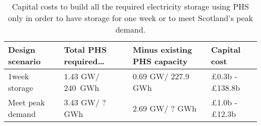 \begin{table}[htbp]
	\caption{Capital costs to build all the required electricity storage using PHS only in order to have storage for one week or to meet Scotland's peak demand.}
	\label{tbl:costs}
	\centering
		\begin{tabular}{@{}llll@{}}
		\toprule
		Design scenario & Total PHS required\ldots & Minus existing PHS capacity & Capital cost \\ \midrule
		1week storage & 1.43 GW/ 240~GWh & 0.69 GW/ 227.9 GWh & £0.3b - £138.8b \\
		Meet peak demand & 3.43 GW/ ? GWh & 2.69 GW/ ? GWh & £1.0b - £12.3b \\ \bottomrule
	\end{tabular}
\end{table}